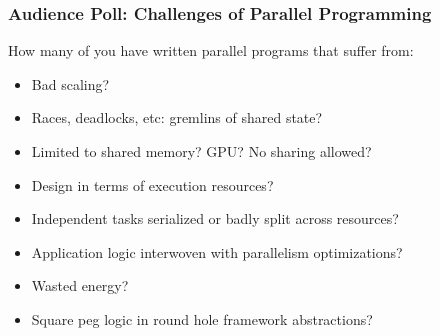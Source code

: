 \begin{frame}
\frametitle{Audience Poll: Challenges of Parallel Programming}
How many of you have written parallel programs that suffer from:
\begin{itemize}
\item Bad scaling?
\pause
\item Races, deadlocks, etc: gremlins of shared state?
\pause
\item Limited to shared memory? GPU? No sharing allowed?
\pause
\item Design in terms of execution resources?
\pause
\item Independent tasks serialized or badly split across resources?
\pause
\item Application logic interwoven with parallelism optimizations?
\pause
\item Wasted energy?
\pause
\item Square peg logic in round hole framework abstractions?
\end{itemize}
\end{frame}

